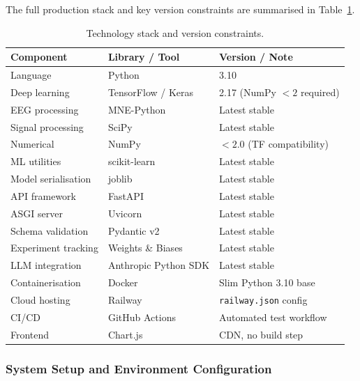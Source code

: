 \documentclass[10pt]{article}
\begin{document}
The full production stack and key version constraints are summarised in Table~\ref{tab:tech-stack}.

\begin{table}[h]
\centering
\small
\renewcommand{\arraystretch}{1.2}
\begin{tabular}{|l|l|l|}
\hline
\textbf{Component} & \textbf{Library / Tool} & \textbf{Version / Note} \\\hline
Language & Python & 3.10 \\\hline
Deep learning & TensorFlow / Keras & 2.17 (NumPy $<2$ required) \\\hline
EEG processing & MNE-Python & Latest stable \\\hline
Signal processing & SciPy & Latest stable \\\hline
Numerical & NumPy & $<2.0$ (TF compatibility) \\\hline
ML utilities & scikit-learn & Latest stable \\\hline
Model serialisation & joblib & Latest stable \\\hline
API framework & FastAPI & Latest stable \\\hline
ASGI server & Uvicorn & Latest stable \\\hline
Schema validation & Pydantic v2 & Latest stable \\\hline
Experiment tracking & Weights \& Biases & Latest stable \\\hline
LLM integration & Anthropic Python SDK & Latest stable \\\hline
Containerisation & Docker & Slim Python 3.10 base \\\hline
Cloud hosting & Railway & \texttt{railway.json} config \\\hline
CI/CD & GitHub Actions & Automated test workflow \\\hline
Frontend & Chart.js & CDN, no build step \\\hline
\end{tabular}
\caption{Technology stack and version constraints.}
\label{tab:tech-stack}
\end{table}

\subsubsection{System Setup and Environment Configuration}
\label{sec:systemSetup}
\end{document}
